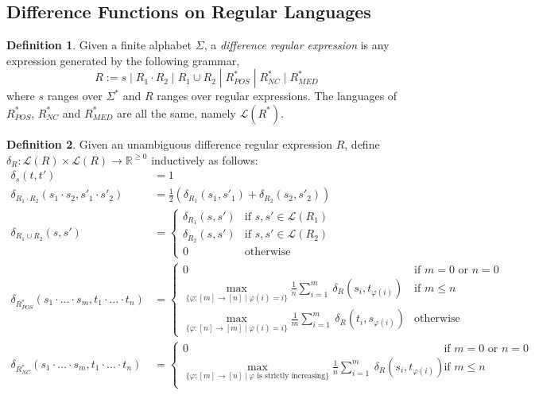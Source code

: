 \documentclass[acmsmall,review,anonymous]{acmart}\settopmatter{printfolios=true,printccs=false,printacmref=false}
\theoremstyle{definition}
\newtheorem{definition}{Definition}
\begin{document}
\subsection{Difference Functions on Regular Languages}
\begin{definition}
Given a finite alphabet $\Sigma$, a {\em difference regular expression} is any expression generated by the following grammar,
$$R := s \; | \; R_1 \cdot R_2 \; | \; R_1 \cup R_2 \; | \; R^*_{POS} \; | \; R^*_{NC} \; | \; R^*_{MED}$$
where $s$ ranges over $\Sigma^*$ and $R$ ranges over regular expressions. The languages of $R^*_{POS}$, $R^*_{NC}$ and $R^*_{MED}$ are all the same, namely $\mathcal{L}(R^*)$.
\end{definition}
\begin{definition}
Given an unambiguous difference regular expression $R$, define $\delta_R : \mathcal{L}(R) \times \mathcal{L}(R) \longrightarrow \mathbb{R}^{\geq 0}$ inductively as follows:
\begin{align*}
\delta_s(t, t') &= 1\\
\delta_{R_1 \cdot R_2}(s_1 \cdot s_2, s'_1 \cdot s'_2) &= \frac{1}{2}(\delta_{R_1}(s_1, s'_1) + \delta_{R_2}(s_2, s'_2))\\
\delta_{R_1 \cup R_2}(s, s') &= 
\begin{cases}
\delta_{R_1}(s, s') & \text{if }s, s' \in \mathcal{L}(R_1) \\
\delta_{R_2}(s, s') & \text{if }s, s' \in \mathcal{L}(R_2)\\
0 & \text{otherwise }
\end{cases}\\
\delta_{R^*_{POS}}(s_1 \cdot \ldots \cdot s_m, t_1 \cdot \ldots \cdot t_n) &= 
\begin{cases}
0 & \text{if } m=0 \text{ or } n=0\\
\max\limits_{\{\varphi : [m] \longrightarrow [n] \; | \; \varphi(i) = i\}}\frac{1}{n}\sum\limits_{i=1}^{m}\ \delta_R(s_i, t_{\varphi(i)})& \text{if } m \leq n\\
\max\limits_{\{\varphi : [n] \longrightarrow [m] \; | \; \varphi(i) = i\}}\frac{1}{m}\sum\limits_{i=1}^{m}\ \delta_R(t_i, s_{\varphi(i)})& \text{otherwise}
\end{cases}\\
\delta_{R^*_{NC}}(s_1 \cdot \ldots \cdot s_m, t_1 \cdot \ldots \cdot t_n) &= 
\begin{cases}
0 & \text{if } m=0 \text{ or } n=0\\
\max\limits_{\{\varphi : [m] \longrightarrow [n] \; | \; \varphi \text{ is strictly increasing}\}}\frac{1}{n}\sum\limits_{i=1}^{m}\ \delta_R(s_i, t_{\varphi(i)})& \text{if } m \leq n\\

\end{cases}
\end{align*}
\end{definition}
\end{document}

